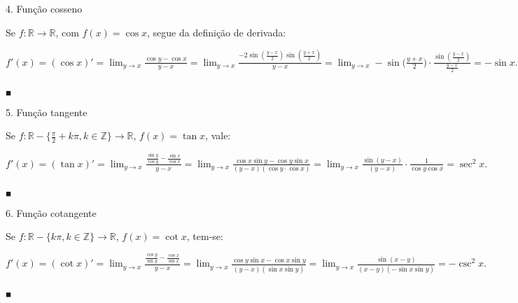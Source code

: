 \documentclass{article}
\begin{document}
{\begin{newpage}
\par
\vspace{0.3cm}
\begin{flushleft}
4. Função cosseno
\end{flushleft}
\par Se $f:\mathbb{R}\rightarrow\mathbb{R}$, com $f(x)=\cos{x}$, segue da definição de derivada:
\par $f'(x)=(\cos{x})'=\displaystyle{\lim_{y\to x}} \frac{\cos{y} - \cos{x}}{y-x} = \displaystyle{\lim_{y\to x}} \frac{-2\sin{(\frac{y-x}{2})}\sin{(\frac{y+x}{2})}}{y-x} = \displaystyle{\lim_{y\to x}} -\sin{\Big(\frac{y+x}{2}\Big)}\cdot\frac{\sin{(\frac{y-x}{2})}}{\frac{y-x}{2}} = -\sin{x}.$ \begin{flushright} $_{\blacksquare }$ \end{flushright}
\par
\vspace{0.3cm}
\begin{flushleft}
5. Função tangente
\end{flushleft}
\par Se $f:\mathbb{R}-\Big\{\displaystyle{\frac{\pi }{2}} + k\pi, k\in\mathbb{Z}\Big\}\rightarrow\mathbb{R}$, $f(x)=\tan{x}$, vale:
\par $f'(x)=(\tan{x})'=\displaystyle{\lim_{y\to x}} \frac{\frac{\sin{y}}{\cos{y}} - \frac{\sin{x}}{\cos{x}}}{y-x} = \displaystyle{\lim_{y\to x}} \frac{\cos{x}\sin{y} - \cos{y}\sin{x}}{(y-x)(\cos{y}\cdot\cos{x})} = \displaystyle{\lim_{y\to x}} \frac{\sin{(y-x)}}{(y-x)}\cdot\frac{1}{\cos{y}\cos{x}} = \sec^2{x}.$\begin{flushright} $_{\blacksquare }$ \end{flushright}
\par
\vspace{0.3cm}
\begin{flushleft}
6. Função cotangente
\end{flushleft}
\par Se $f:\mathbb{R}-\{{k\pi, k\in\mathbb{Z}}\}\rightarrow\mathbb{R}$, $f(x)=\cot{x}$, tem-se:
\par $f'(x)=(\cot{x})'=\displaystyle{\lim_{y\to x}} \frac{\frac{\cos{y}}{\sin{y}} - \frac{\cos{x}}{\sin{x}}}{y-x} = \displaystyle{\lim_{y\to x}} \frac{\cos{y}\sin{x} - \cos{x}\sin{y}}{(y-x)(\sin{x}\sin{y})} = \displaystyle{\lim_{y\to x}} \frac{\sin{(x-y)}}{(x-y)(-\sin{x}\sin{y})} = -\csc^2{x}.$\begin{flushright} $_{\blacksquare }$ \end{flushright}
\par

\end{newpage}}
\end{document}
